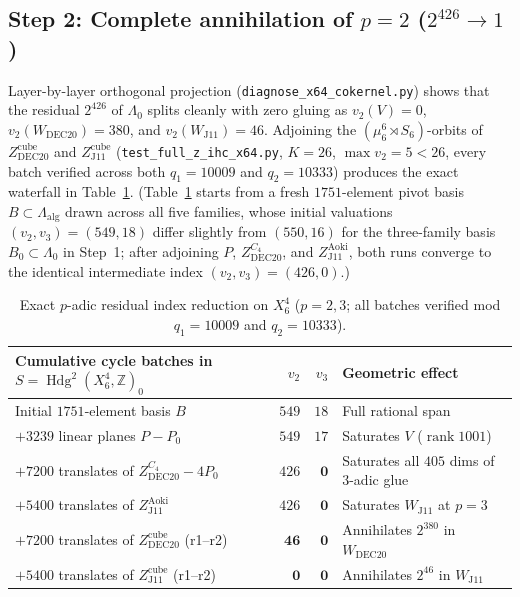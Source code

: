 \documentclass[11pt,a4paper]{amsart}
\theoremstyle{definition}
\newcommand{\ZZ}{\mathbb{Z}}
\newcommand{\Hdg}{\operatorname{Hdg}}
\newcommand{\rank}{\operatorname{rank}}
\begin{document}
\subsection{Step 2: Complete annihilation of \texorpdfstring{$p = 2$ ($2^{426} \to 1$)}{p = 2 (index 2 to the 426 -> 1)}}
Layer-by-layer orthogonal projection (\texttt{diagnose\_x64\_cokernel.py}) shows that the residual $2^{426}$ of $\Lambda_0$ splits cleanly with zero gluing as $v_2(V) = 0$, $v_2(W_{\mathrm{DEC20}}) = 380$, and $v_2(W_{\mathrm{J11}}) = 46$.
Adjoining the $(\mu_6^6 \rtimes S_6)$-orbits of $Z_{\mathrm{DEC20}}^{\mathrm{cube}}$ and $Z_{\mathrm{J11}}^{\mathrm{cube}}$ (\texttt{test\_full\_z\_ihc\_x64.py}, $K = 26$, $\max v_2 = 5 < 26$, every batch verified across both $q_1 = 10009$ and $q_2 = 10333$) produces the exact waterfall in Table~\ref{tab:x64}.
(Table~\ref{tab:x64} starts from a fresh $1751$-element pivot basis $B \subset \Lambda_{\mathrm{alg}}$ drawn across all five families, whose initial valuations $(v_2, v_3) = (549, 18)$ differ slightly from $(550, 16)$ for the three-family basis $B_0 \subset \Lambda_0$ in Step~1; after adjoining $P$, $Z_{\mathrm{DEC20}}^{C_4}$, and $Z_{\mathrm{J11}}^{\mathrm{Aoki}}$, both runs converge to the identical intermediate index $(v_2, v_3) = (426, 0)$.)

\begin{table}[ht]
\centering
\caption{Exact $p$-adic residual index reduction on $X_6^4$ ($p = 2, 3$; all batches verified mod $q_1 = 10009$ and $q_2 = 10333$).}\label{tab:x64}
\small
\begin{tabular}{@{}lrrl@{}}
\hline
Cumulative cycle batches in $S = \Hdg^2(X_6^4, \ZZ)_0$ & $v_2$ & $v_3$ & Geometric effect \\
\hline
Initial $1751$-element basis $B$ & $549$ & $18$ & Full rational span \\
$+ 3239$ linear planes $P - P_0$ & $549$ & $17$ & Saturates $V$ ($\rank 1001$) \\
$+ 7200$ translates of $Z_{\mathrm{DEC20}}^{C_4} - 4 P_0$ & $426$ & $\mathbf{0}$ & Saturates all $405$ dims of $3$-adic glue \\
$+ 5400$ translates of $Z_{\mathrm{J11}}^{\mathrm{Aoki}}$ & $426$ & $\mathbf{0}$ & Saturates $W_{\mathrm{J11}}$ at $p = 3$ \\
$+ 7200$ translates of $Z_{\mathrm{DEC20}}^{\mathrm{cube}}$ (r1--r2) & $\mathbf{46}$ & $\mathbf{0}$ & Annihilates $2^{380}$ in $W_{\mathrm{DEC20}}$ \\
$+ 5400$ translates of $Z_{\mathrm{J11}}^{\mathrm{cube}}$ (r1--r2) & $\mathbf{0}$ & $\mathbf{0}$ & Annihilates $2^{46}$ in $W_{\mathrm{J11}}$ \\
\hline
\end{tabular}
\end{table}
\end{document}
